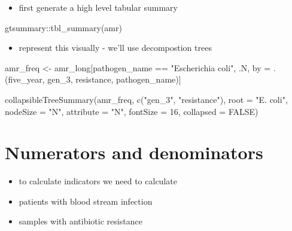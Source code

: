 \documentclass[
  letterpaper,
  DIV=11,
  numbers=noendperiod]{scrreprt}
\newenvironment{Shaded}{\begin{snugshade}}{\end{snugshade}}
\newcommand{\AttributeTok}[1]{\textcolor[rgb]{0.40,0.45,0.13}{#1}}
\newcommand{\ConstantTok}[1]{\textcolor[rgb]{0.56,0.35,0.01}{#1}}
\newcommand{\DecValTok}[1]{\textcolor[rgb]{0.68,0.00,0.00}{#1}}
\newcommand{\FunctionTok}[1]{\textcolor[rgb]{0.28,0.35,0.67}{#1}}
\newcommand{\NormalTok}[1]{\textcolor[rgb]{0.00,0.23,0.31}{#1}}
\newcommand{\OtherTok}[1]{\textcolor[rgb]{0.00,0.23,0.31}{#1}}
\newcommand{\SpecialCharTok}[1]{\textcolor[rgb]{0.37,0.37,0.37}{#1}}
\newcommand{\StringTok}[1]{\textcolor[rgb]{0.13,0.47,0.30}{#1}}
\providecommand{\tightlist}{%
  \setlength{\itemsep}{0pt}\setlength{\parskip}{0pt}}\usepackage{longtable,booktabs,array}
\begin{document}
\begin{itemize}
\tightlist
\item
  first generate a high level tabular summary
\end{itemize}

\begin{Shaded}
\begin{Highlighting}[]
\NormalTok{gtsummary}\SpecialCharTok{::}\FunctionTok{tbl\_summary}\NormalTok{(amr)}
\end{Highlighting}
\end{Shaded}

\begin{itemize}
\tightlist
\item
  represent this visually - we'll use decompostion trees
\end{itemize}

\begin{Shaded}
\begin{Highlighting}[]
\NormalTok{amr\_freq }\OtherTok{\textless{}{-}}\NormalTok{ amr\_long[pathogen\_name }\SpecialCharTok{==} \StringTok{"Escherichia coli"}\NormalTok{, .N, by }\OtherTok{=}\NormalTok{ .(five\_year, gen\_3, resistance, pathogen\_name)]}

\FunctionTok{collapsibleTreeSummary}\NormalTok{(amr\_freq, }
                       \FunctionTok{c}\NormalTok{(}\StringTok{"gen\_3"}\NormalTok{, }\StringTok{"resistance"}\NormalTok{), }
                       \AttributeTok{root =} \StringTok{"E. coli"}\NormalTok{, }
                       \AttributeTok{nodeSize =} \StringTok{"N"}\NormalTok{, }
                       \AttributeTok{attribute =} \StringTok{"N"}\NormalTok{, }
                       \AttributeTok{fontSize =} \DecValTok{16}\NormalTok{, }
                       \AttributeTok{collapsed =} \ConstantTok{FALSE}\NormalTok{)}
\end{Highlighting}
\end{Shaded}

\section{Numerators and denominators}\label{numerators-and-denominators}

\begin{itemize}
\tightlist
\item
  to calculate indicators we need to calculate
\item
  patients with blood stream infection
\item
  samples with antibiotic resistance
\end{itemize}
\end{document}
